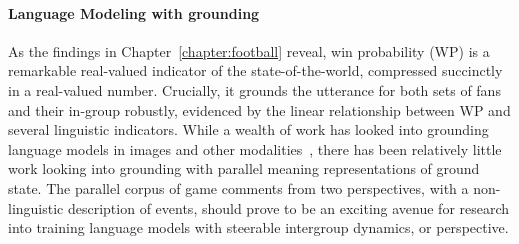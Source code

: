 \paragraph{Language Modeling with grounding} As the findings in Chapter~\ref{chapter:football} reveal, win probability (WP) is a remarkable real-valued indicator of the state-of-the-world, compressed succinctly in a real-valued number. Crucially, it grounds the utterance for both sets of fans and their in-group robustly, evidenced by the linear relationship between WP and several linguistic indicators. While a wealth of work has looked into grounding language models in images and other modalities~\citep{Radford2021LearningTV}, there has been relatively little work looking into grounding with parallel meaning representations of ground state. The parallel corpus of game comments from two perspectives, with a non-linguistic description of events, should prove to be an exciting avenue for research into training language models with steerable intergroup dynamics, or perspective.
